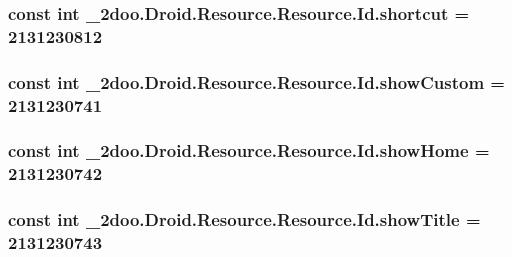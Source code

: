 \hypertarget{class__2doo_1_1_droid_1_1_resource_1_1_id_733e2dbc6a6ed2a78fc0398ea27af228}{
\subsubsection[{shortcut}]{\setlength{\rightskip}{0pt plus 5cm}const int \_\-2doo.Droid.Resource.Resource.Id.shortcut = 2131230812}}
\label{class__2doo_1_1_droid_1_1_resource_1_1_id_733e2dbc6a6ed2a78fc0398ea27af228}


\hypertarget{class__2doo_1_1_droid_1_1_resource_1_1_id_b042d79ea6f251e6eb6fe0b82de0d7c5}{
\subsubsection[{showCustom}]{\setlength{\rightskip}{0pt plus 5cm}const int \_\-2doo.Droid.Resource.Resource.Id.showCustom = 2131230741}}
\label{class__2doo_1_1_droid_1_1_resource_1_1_id_b042d79ea6f251e6eb6fe0b82de0d7c5}


\hypertarget{class__2doo_1_1_droid_1_1_resource_1_1_id_423c2d59006759dc0a4eabc043d769bd}{
\subsubsection[{showHome}]{\setlength{\rightskip}{0pt plus 5cm}const int \_\-2doo.Droid.Resource.Resource.Id.showHome = 2131230742}}
\label{class__2doo_1_1_droid_1_1_resource_1_1_id_423c2d59006759dc0a4eabc043d769bd}


\hypertarget{class__2doo_1_1_droid_1_1_resource_1_1_id_8681673e9f43ef0e7ca96cb57b90155a}{
\subsubsection[{showTitle}]{\setlength{\rightskip}{0pt plus 5cm}const int \_\-2doo.Droid.Resource.Resource.Id.showTitle = 2131230743}}
\label{class__2doo_1_1_droid_1_1_resource_1_1_id_8681673e9f43ef0e7ca96cb57b90155a}


